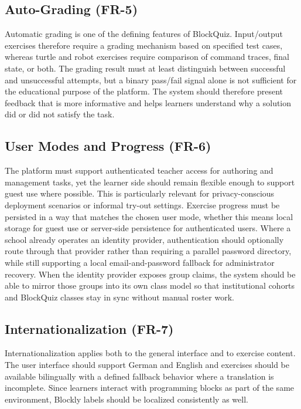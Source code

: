 \subsection*{Auto-Grading (FR-5)}
Automatic grading is one of the defining features of BlockQuiz. Input/output exercises therefore require a grading mechanism based on specified test cases, whereas turtle and robot exercises require
comparison of command traces, final state, or both.
The grading result must at least distinguish between successful and unsuccessful attempts, but a binary pass/fail signal alone is not sufficient for the educational purpose of the platform.
The system should therefore present feedback that is more informative and helps learners understand why a solution did or did not satisfy the task.

\subsection*{User Modes and Progress (FR-6)}
The platform must support authenticated teacher access for authoring and management tasks, 
yet the learner side should remain flexible enough to support guest use where possible. 
This is particularly relevant for privacy-conscious deployment scenarios or informal try-out settings. 
Exercise progress must be persisted in a way that matches the chosen user mode, whether this means local storage for guest 
use or server-side persistence for authenticated users. 
Where a school already operates an identity provider, authentication should optionally route through that provider rather than requiring a parallel password directory, while still supporting
a local email-and-password fallback for administrator recovery. When the identity provider exposes group claims, the system should be able to mirror those groups into its own class model so that 
institutional cohorts and BlockQuiz classes stay in sync without manual roster work. 

\subsection*{Internationalization (FR-7)}
Internationalization applies both to the general interface and to exercise content. The user interface should support German and English and exercises should be available bilingually with a defined 
fallback behavior where a translation is incomplete. Since learners interact with programming blocks as part of the same environment, Blockly labels should be localized consistently as well.

